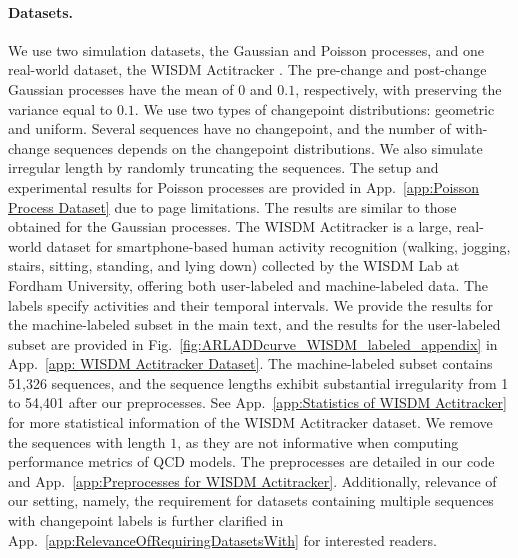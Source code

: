 \documentclass{article}
\theoremstyle{plain}
\theoremstyle{definition}
\theoremstyle{remark}
\begin{document}
\paragraph{Datasets.}
We use two simulation datasets, the Gaussian and Poisson processes, and one real-world dataset, the WISDM Actitracker \citep{kwapisz2011activity_WISDM_Actitracker_dataset}.
The pre-change and post-change Gaussian processes have the mean of $0$ and $0.1$, respectively, with preserving the variance equal to $0.1$.
We use two types of changepoint distributions: geometric and uniform.
Several sequences have no changepoint, and the number of with-change sequences depends on the changepoint distributions.
We also simulate irregular length by randomly truncating the sequences.
The setup and experimental results for Poisson processes are provided in App.~\ref{app:Poisson Process Dataset} due to page limitations. 
The results are similar to those obtained for the Gaussian processes.
The WISDM Actitracker is a large, real-world dataset for smartphone-based human activity recognition (walking, jogging, stairs, sitting, standing, and lying down) collected by the WISDM Lab at Fordham University, offering both user-labeled and machine-labeled data.
The labels specify activities and their temporal intervals.
We provide the results for the machine-labeled subset in the main text, and the results for the user-labeled subset are provided in Fig.~\ref{fig:ARLADDcurve_WISDM_labeled_appendix} in App.~\ref{app: WISDM Actitracker Dataset}.
The machine-labeled subset contains 51,326 sequences, and the sequence lengths exhibit substantial irregularity from 1 to 54,401 after our preprocesses. 
See App.~\ref{app:Statistics of WISDM Actitracker} for more statistical information of the WISDM Actitracker dataset.
We remove the sequences with length $1$, as they are not informative when computing performance metrics of QCD models.
The preprocesses are detailed in our code and App.~\ref{app:Preprocesses for WISDM Actitracker}.
Additionally, relevance of our setting, namely, the requirement for datasets containing multiple sequences with changepoint labels is further clarified in App.~\ref{app:RelevanceOfRequiringDatasetsWith} for interested readers.


\end{document}
